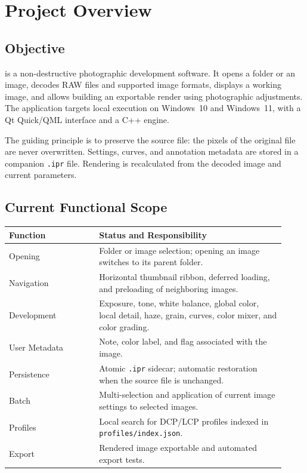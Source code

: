 \chapter{Project Overview}
\label{chap:projet}

\section{Objective}

\IPR{} is a non-destructive photographic development software. It opens a folder or an image, decodes RAW files and supported image formats, displays a working image, and allows building an exportable render using photographic adjustments. The application targets local execution on Windows~10 and Windows~11, with a Qt Quick/QML interface and a C++ engine.

The guiding principle is to preserve the source file: the pixels of the original file are never overwritten. Settings, curves, and annotation metadata are stored in a companion \texttt{.ipr} file. Rendering is recalculated from the decoded image and current parameters.

\section{Current Functional Scope}

\begin{longtable}{p{0.30\linewidth}p{0.62\linewidth}}
\toprule
Function & Status and Responsibility \\
\midrule
Opening & Folder or image selection; opening an image switches to its parent folder. \\
Navigation & Horizontal thumbnail ribbon, deferred loading, and preloading of neighboring images. \\
Development & Exposure, tone, white balance, global color, local detail, haze, grain, curves, color mixer, and color grading. \\
User Metadata & Note, color label, and flag associated with the image. \\
Persistence & Atomic \texttt{.ipr} sidecar; automatic restoration when the source file is unchanged. \\
Batch & Multi-selection and application of current image settings to selected images. \\
Profiles & Local search for DCP/LCP profiles indexed in \texttt{profiles/index.json}. \\
Export & Rendered image exportable and automated export tests. \\
\bottomrule
\end{longtable}

